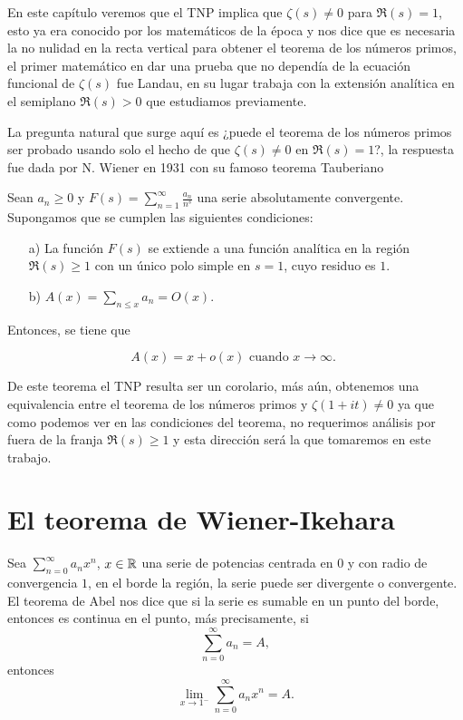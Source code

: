 En este capítulo veremos que el TNP implica que $\zeta(s)\neq 0$ para $\Re(s)=1$, esto ya era conocido por los matemáticos de la época y nos dice que es necesaria la no nulidad en la recta vertical para obtener el teorema de los números primos, el primer matemático en dar una prueba que no dependía de la ecuación funcional de $\zeta(s)$ fue Landau, en su lugar trabaja con la extensión analítica en el semiplano $\Re(s)>0$ que estudiamos previamente.

La pregunta natural que surge aquí es ¿puede el teorema de los números primos ser probado usando solo el hecho de que $\zeta(s)\neq 0$ en $\Re(s)=1$?, la respuesta fue dada por N. Wiener en 1931 con su famoso teorema Tauberiano


\begin{theorem}
Sean $a_n \geq 0$ y $F(s)=\displaystyle\sum_{n=1}^{\infty} \frac{a_n}{n^s}$ una serie absolutamente convergente. Supongamos que se cumplen las siguientes condiciones:

\begin{itemize}
\item[a)] La función $F(s)$ se extiende a una función analítica en la región $\Re(s) \geq 1$ con un único polo simple en $s=1$, cuyo residuo es $1$.
\item[b)] $A(x)=\displaystyle \sum_{n \leq x} a_n=O(x)$.
\end{itemize}


Entonces, se tiene que

$$
A(x)=x+o(x) \text { cuando } x \rightarrow \infty \text {. }
$$
\end{theorem}

De este teorema el TNP resulta ser un corolario, más aún, obtenemos una equivalencia entre el teorema de los números primos y $\zeta(1+it)\neq 0$ ya que como podemos ver en las condiciones del teorema, no requerimos análisis por fuera de la franja $\Re(s)\geq 1$ y esta dirección será la que tomaremos en este trabajo.

\section{El teorema de Wiener-Ikehara}

Sea $\displaystyle \sum_{n=0}^{\infty} a_n x^n$, $x\in \mathbb{R}$ una serie de potencias centrada en $0$ y con radio  de convergencia $1$, en el borde la región, la serie puede ser divergente o convergente. El teorema de Abel nos dice que si la serie es sumable en un punto del borde, entonces es continua en el punto, más precisamente, si
$$\sum_{n=0}^{\infty} a_n=A,$$
entonces
$$\lim_{x \to 1^-}\sum_{n=0}^{\infty} a_n x^n=A.$$

